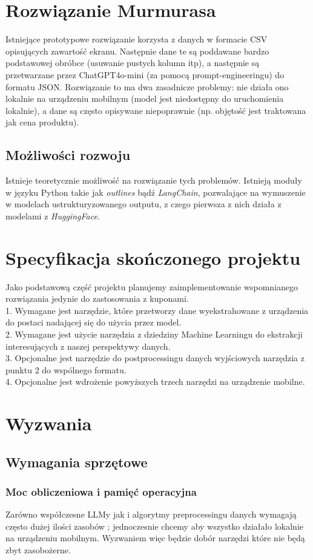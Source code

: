 \documentclass[12pt]{article}
\begin{document}
\section*{Rozwiązanie Murmurasa}
Istniejące prototypowe rozwiązanie korzysta z danych w formacie CSV opisujących zawartość ekranu.  Następnie dane te są poddawane bardzo podstawowej obróbce (usuwanie pustych kolumn itp), a następnie są przetwarzane przez ChatGPT4o-mini (za pomocą prompt-engineeringu) do formatu JSON. Rozwiązanie to ma dwa zasadnicze problemy: nie działa ono lokalnie na urządzeniu mobilnym (model jest niedostępny do uruchomienia lokalnie), a dane są często opisywane niepoprawnie (np. objętość jest traktowana jak cena produktu).
\subsection*{Możliwości rozwoju}
Istnieje teoretycznie możliwość na rozwiązanie tych problemów. Istnieją moduły w języku Python takie jak \textit{outlines}\cite{willard2023efficient} bądź \textit{LangChain}\cite{Chase_LangChain_2022}, pozwalające na wymuszenie w modelach ustrukturyzowanego outputu, z czego pierwsza z nich działa z modelami z \textit{HuggingFace}.
\section*{Specyfikacja skończonego projektu}
Jako podstawową część projektu planujemy zaimplementowanie wspomnianego rozwiązania jedynie do zastosowania z kuponami.\\
1. Wymagane jest narzędzie, które przetworzy dane wyekstrahowane z urządzenia do postaci nadającej się do użycia przez model. \\
2. Wymagane jest użycie narzędzia z dziedziny Machine Learningu do ekstrakcji interesujących z naszej perspektywy danych. \\
3. Opcjonalne jest narzędzie do postprocessingu danych wyjściowych narzędzia z punktu 2 do wspólnego formatu. \\
4. Opcjonalne jest wdrożenie powyższych trzech narzędzi na urządzenie mobilne.
\section*{Wyzwania}
\subsection*{Wymagania sprzętowe}
\subsubsection*{Moc obliczeniowa i pamięć operacyjna}
Zarówno współczesne LLMy jak i algorytmy preprocessingu danych wymagają często dużej ilości zasobów \cite{LLMmobile2024}; jednoczesnie chcemy aby wszystko działało lokalnie na urządzeniu mobilnym. Wyzwaniem więc będzie dobór narzędzi które nie będą zbyt zasobożerne.
\end{document}
